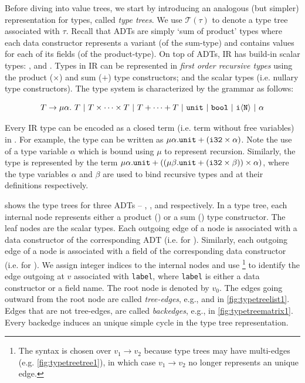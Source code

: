 Before diving into value trees, we start by introducing an analogous (but simpler) representation for types, called {\em type trees}.
We use $\mathcal{T}(\tau)$ to denote a type tree associated with $\tau$.
Recall that ADTs are simply `sum of product' types where each data constructor represents a variant (of the sum-type) and
contains values for each of its fields (of the product-type).
On top of ADTs, IR has build-in scalar types: ,  and .
Types in IR can be represented in {\em first order recursive types} \cite{recursivetypestrees} using the product ($\times$) and sum ($+$) type
constructors; and the scalar types (i.e. nullary type constructors).
The type system is characterized by the grammar \typegrammar{} as follows:

$$
T \rightarrow \mu \alpha. \ T \ |\ T \times \dots \times T \ |\  T + \dots + T \ |\  \type{unit} \ |\ \type{bool} \ |\  \type{i\langle N \rangle} \ |\ \alpha
$$

Every IR type can be encoded as a closed term (i.e. term without free variables) in \typegrammar{}.
For example, the  type can be written as $\mu \alpha. {\tt unit} + ({\tt i32} \times \alpha)$.
Note the use of a type variable $\alpha$ which is bound using $\mu$ to represent recursion.
Similarly, the  type is represented by the term
$\mu \alpha. {\tt unit} + ((\mu \beta. {\tt unit} + ({\tt i32} \times \beta)) \times \alpha)$,
where the type variables $\alpha$ and $\beta$ are used to bind recursive types  and 
at their definitions respectively.


 shows the type trees for three ADTs -- , , and  respectively.
In a type tree, each internal node represents either a product (\prodn{}) or a sum (\sumn{}) type constructor.
The leaf nodes are the scalar types.
Each outgoing edge of a \sumn{} node is associated with a data constructor of the corresponding ADT (i.e.  for ).
Similarly, each outgoing edge of a \prodn{} node is associated with a field of the corresponding data constructor (i.e.  for ).
We assign integer indices to the internal nodes and use \footnote{
The  syntax is chosen over $v_1 \rightarrow v_2$ because
type trees may have multi-edges (e.g. \cref{fig:typetreetree1}), in which case
$v_1 \rightarrow v_2$ no longer represents an unique edge.}
to identify the edge outgoing at $v$ associated with {\tt label},
where {\tt label} is either a data constructor or a field name.
The root node is denoted by $v_0$.
The edges going outward from the root node are called {\em tree-edges}, e.g.,  and  in \cref{fig:typetreelist1}.
Edges that are not tree-edges, are called {\em backedges}, e.g.,  in \cref{fig:typetreematrix1}.
Every backedge induces an unique simple cycle in the type tree representation.


